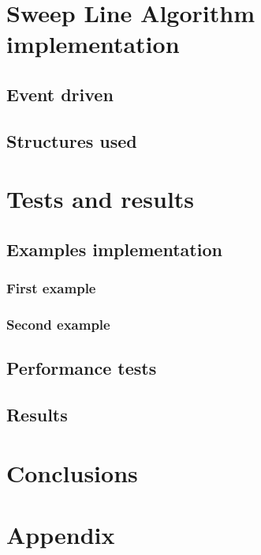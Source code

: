 \documentclass[10pt,a4paper,hidelinks]{article}
\begin{document}

\section{Sweep Line Algorithm implementation}
\subsection{Event driven}
\subsection{Structures used}

\section{Tests and results}
\subsection{Examples implementation}
\subsubsection{First example}
\subsubsection{Second example}
\subsection{Performance tests}
\subsection{Results}

\section{Conclusions}
\section{Appendix}


\newpage
\listoffigures
\lstlistoflistings
\listoftables
\end{document}
